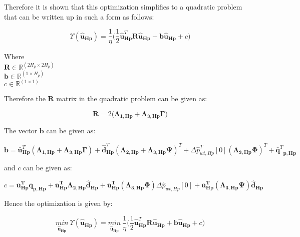 Therefore it is shown that this optimization simplifies to a quadratic problem that can be written up in such a form as follows:

\begin{equation}
  \Upsilon({\bm{\hat{u}}}_{\bm{{Hp}}}) = \frac{1}{\eta}\Big( \frac{1}{2} \bm{\hat{u}}_{\bm{Hp}}^{T} \bm{R} \bm{\hat{u}}_{\bm{Hp}} + \bm{b} \bm{\hat{u}}_{\bm{Hp}} + c \Big)
\end{equation}

\begin{minipage}[t]{0.28\textwidth}
Where\\
\hspace*{8mm} $\bm{R} \in \pmb{\mathbb{R}}^{(2 H_p \times 2 H_p)} $ \\
\hspace*{8mm} $\bm{b} \in \pmb{\mathbb{R}}^{(1 \times H_p)} $ \\
\hspace*{8mm} $c \in \mathbb{R}^{(1 \times 1)} $
\end{minipage}

Therefore the $\bm{R}$ matrix in the quadratic problem can be given as:

\begin{equation}
  \bm{R} = 2\Big(\bm{\Lambda}_{\bm{1,Hp}} + \bm{\Lambda}_{\bm{3,Hp}} \bm{\Gamma}\Big) 
\end{equation}

The vector $\bm{b}$ can be given as:

\begin{equation}
\!\! \bm{b} = \bm{\bar{u}}_{\bm{Hp}}^{T}(\bm{\Lambda}_{\bm{1,Hp}} \!+ \!\bm{\Lambda}_{\bm{3,Hp}} \bm{\Gamma} )\! + \!\bm{\hat{d}}_{\bm{Hp}}^{T}(\bm{\Lambda}_{\bm{2,Hp}}\! + \!\bm{\Lambda}_{\bm{3,Hp}} \bm{\Psi} )^{T}
  + \Delta \hat{p}_{wt,Hp}^{T}[0] (\bm{\Lambda}_{\bm{3,Hp}} \bm{\Phi})^{T} + {\bm{\bar{q}}^{T}}_{\bm{p,Hp}}
\end{equation}

and $c$ can be given as:

\begin{equation}
\!\! c = \bm{\bar{u}_{Hp}^T} \bm{\bar{q}_{p,Hp}} + \bm{\bar{u}_{Hp}^T} \bm{\Lambda}_{\bm{2,Hp}} \bm{\hat{d}}_{\bm{Hp}} +  \bm{\bar{u}_{Hp}^T} (\bm{\Lambda}_{\bm{3,Hp}} \bm{\Phi}) \Delta \hat{p}_{wt,Hp}[0] + \bm{\bar{u}_{Hp}^T} (\bm{\Lambda}_{\bm{3,Hp}} \bm{\Psi})  \bm{\hat{d}_{Hp}}
\end{equation}

Hence the optimization is given by:

\begin{equation}
\underset{\bm{\hat{u}_{Hp}}}{min} \:  \Upsilon({\bm{\hat{u}}}_{\bm{{Hp}}}) = \underset{\bm{\hat{u}_{Hp}}}{min} \:  \frac{1}{\eta}\bigg( \frac{1}{2} \bm{\hat{u}}_{\bm{Hp}}^{T} \bm{R} \bm{\hat{u}}_{\bm{Hp}} + \bm{b} \bm{\hat{u}}_{\bm{Hp}} + c \bigg)
\label{eq:obj_final}
\end{equation}